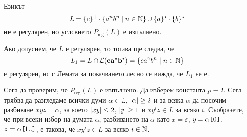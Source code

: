 \begin{example}
  Езикът
  \[L = \{c\}^+\cdot\{a^nb^n\mid n\in\mathbb{N}\}\cup \{a\}^\star \cdot \{b\}^\star\]
  {\bf не} е регулярен, но условието $P_{\text{reg}}(L)$ е изпълнено.
\end{example}
\begin{hint}
  Ако допуснем, че $L$ е регулярен, то тогава ще следва, че 
  \[L_1 = L\cap \mathcal{L}(\mathbf{ca^\star b^\star}) = \{ca^nb^n \mid n\in\mathbb{N}\}\]
  е регулярен, но с \hyperref[lem:pumping-reg]{Лемата за покачването} лесно се вижда, че $L_1$ не е.

  Сега да проверим, че $P_{\text{reg}}(L)$ е изпълнено. Да изберем константа $p = 2$.
  Сега трябва да разгледаме всички думи $\alpha \in L$, $\vert{\alpha}\vert \geq 2$
  и за всяка $\alpha$ да посочим разбиване $xyz = \alpha$, за което $\vert{xy}\vert \leq 2$, $\vert{y}\vert \geq 1$ и $xy^iz \in L$ за всяко $i$.
  Съобразете, че при всеки избор на думата $\alpha$, разбиването на $\alpha$
  като $x = \varepsilon$, $y = \alpha\texttt{[}{0}\texttt{]}$, $z = \alpha\texttt{[}{1..}\texttt{]}$,
  е такова, че $xy^iz \in L$ за всяко $i \in \mathbb{N}$.
\end{hint}


